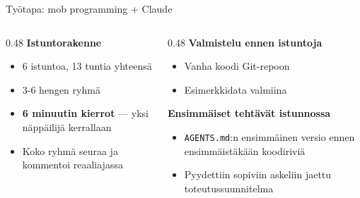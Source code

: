 \documentclass[aspectratio=169]{beamer}
\begin{document}
\begin{frame}{Työtapa: mob programming + Claude}
  \begin{columns}
    \begin{column}{0.48\textwidth}
      \textbf{Istuntorakenne}
      \begin{itemize}
        \item 6 istuntoa, 13 tuntia yhteensä
        \item 3-6 hengen ryhmä
        \item \textbf{6 minuutin kierrot} — yksi näppäilijä kerrallaan
        \item Koko ryhmä seuraa ja kommentoi reaaliajassa
      \end{itemize}
    \end{column}
    \begin{column}{0.48\textwidth}
      \textbf{Valmistelu ennen istuntoja}
      \begin{itemize}
        \item Vanha koodi Git-repoon
        \item Esimerkkidata valmiina
      \end{itemize}
      \vspace{0.5em}
      \textbf{Ensimmäiset tehtävät istunnossa}
      \begin{itemize}
        \item \texttt{AGENTS.md}:n ensimmäinen versio ennen ensimmäistäkään koodiriviä
        \item Pyydettiin sopiviin askeliin jaettu toteutussuunnitelma
      \end{itemize}
    \end{column}
  \end{columns}
\end{frame}
\end{document}
